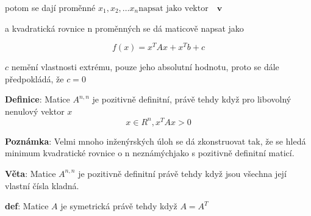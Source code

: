 \documentclass[12pt, letterpaper, twoside]{article}
\begin{document}
potom se dají proměnné $x_{1}, x_{2}, \dots x_{n} \textrm{napsat jako vektor} \quad \textbf{v}$

a kvadratická rovnice n proměnných se dá maticově napsat jako

\[
    f(x) = x^{T}Ax + x^{T}b + c
\]

$c$ nemění vlastnosti extrému, pouze jeho absolutní hodnotu, proto se dále předpokládá, že $c = 0$

\textbf{Definice}: Matice $A^{n,n}$ je pozitivně definitní, právě tehdy když pro libovolný nenulový vektor $x$ 
\[
    x \in R^{n}, x^TAx > 0
\]

\textbf{Poznámka}: Velmi mnoho inženýrských úloh se dá zkonstruovat tak, 
že se hledá minimum kvadratické rovnice o n neznámýchjako s pozitivně definitní maticí.

\textbf{Věta}: Matice $A^{n,n}$ je pozitivně definitní právě tehdy když jsou všechna její vlastní čísla kladná.

\textbf{def}: Matice $A$ je symetrická právě tehdy když $A = A^T$








\end{document}
